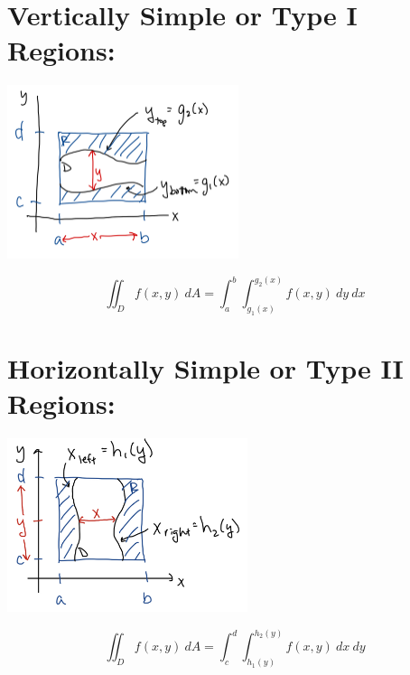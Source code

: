 

\section*{Vertically Simple or Type I Regions:}


\includegraphics[height=2in]{Ch12s2-TypeI.jpeg}

\[
\iint_D f(x,y)\ dA = \int_a^b \int_{g_1(x)}^{g_2(x)} f(x,y)\ dy\ dx
\]


\section*{Horizontally Simple or Type II Regions:}

\includegraphics[height=2in]{Ch12s2-TypeII.jpeg}

\[
\iint_D f(x,y)\ dA = \int_c^d \int_{h_1(y)}^{h_2(y)} f(x,y)\ dx\ dy
\]




%
%

